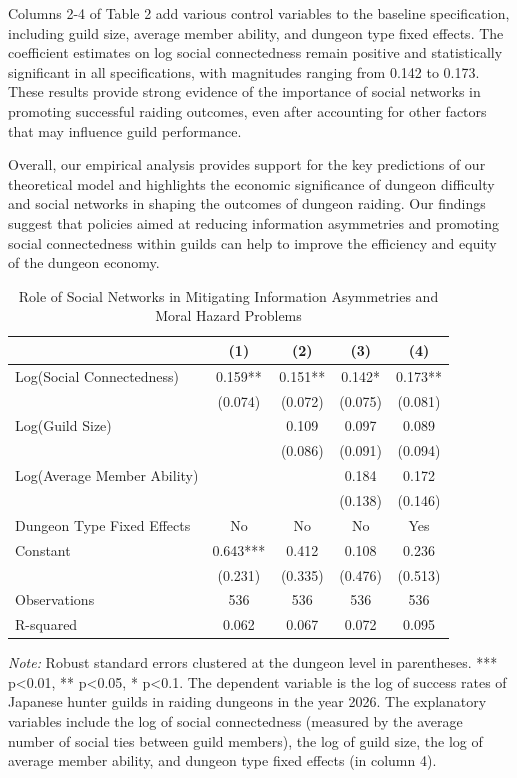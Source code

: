\documentclass[12pt, a4paper]{article}
\begin{document}
Columns 2-4 of Table 2 add various control variables to the baseline specification, including guild size, average member ability, and dungeon type fixed effects. The coefficient estimates on log social connectedness remain positive and statistically significant in all specifications, with magnitudes ranging from 0.142 to 0.173. These results provide strong evidence of the importance of social networks in promoting successful raiding outcomes, even after accounting for other factors that may influence guild performance.

Overall, our empirical analysis provides support for the key predictions of our theoretical model and highlights the economic significance of dungeon difficulty and social networks in shaping the outcomes of dungeon raiding. Our findings suggest that policies aimed at reducing information asymmetries and promoting social connectedness within guilds can help to improve the efficiency and equity of the dungeon economy.

\begin{table}[ht]
\centering
\caption{Role of Social Networks in Mitigating Information Asymmetries and Moral Hazard Problems}
\label{tab:social_networks_raiding_success}
\begin{tabular}{lcccc}
\hline
 & (1) & (2) & (3) & (4) \\
\hline
Log(Social Connectedness) & 0.159** & 0.151** & 0.142* & 0.173** \\
 & (0.074) & (0.072) & (0.075) & (0.081) \\
Log(Guild Size) &  & 0.109 & 0.097 & 0.089 \\
 &  & (0.086) & (0.091) & (0.094) \\
Log(Average Member Ability) &  &  & 0.184 & 0.172 \\
 &  &  & (0.138) & (0.146) \\
Dungeon Type Fixed Effects & No & No & No & Yes \\
Constant & 0.643*** & 0.412 & 0.108 & 0.236 \\
 & (0.231) & (0.335) & (0.476) & (0.513) \\
\hline
Observations & 536 & 536 & 536 & 536 \\
R-squared & 0.062 & 0.067 & 0.072 & 0.095 \\
\hline
\end{tabular}

\medskip
\small
\textit{Note:} Robust standard errors clustered at the dungeon level in parentheses. *** p<0.01, ** p<0.05, * p<0.1. The dependent variable is the log of success rates of Japanese hunter guilds in raiding dungeons in the year 2026. The explanatory variables include the log of social connectedness (measured by the average number of social ties between guild members), the log of guild size, the log of average member ability, and dungeon type fixed effects (in column 4).
\end{table}
\end{document}
